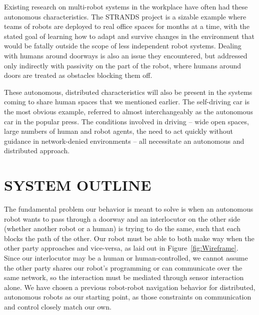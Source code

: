 \documentclass[letterpaper, 10 pt, conference]{ieeeconf}  %
\begin{document}

Existing research on multi-robot systems in the workplace have often had these autonomous characteristics. The STRANDS project\cite{c11} is a sizable example where teams of robots are deployed to real office spaces for months at a time, with the stated goal of learning how to adapt and survive changes in the environment that would be fatally outside the scope of less independent robot systems. Dealing with humans around doorways is also an issue they encountered, but addressed only indirectly with passivity on the part of the robot, where humans around doors are treated as obstacles blocking them off.

These autonomous, distributed characteristics will also be present in the systems coming to share human spaces that we mentioned earlier. The self-driving car is the most obvious example, referred to almost interchangeably as the autonomous car in the popular press\cite{c12}. The conditions involved in driving – wide open spaces, large numbers of human and robot agents, the need to act quickly without guidance in network-denied environments – all necessitate an autonomous and distributed approach.


\section{SYSTEM OUTLINE}

The fundamental problem our behavior is meant to solve is when an autonomous robot wants to pass through a doorway and an interlocutor on the other side (whether another robot or a human) is trying to do the same, such that each blocks the path of the other. Our robot must be able to both make way when the other party approaches and vice-versa, as laid out in Figure~\ref{fig:Wireframe}. Since our interlocutor may be a human or human-controlled, we cannot assume the other party shares our robot’s programming or can communicate over the same network, so the interaction must be mediated through sensor interaction alone. We have chosen a previous robot-robot navigation behavior for distributed, autonomous robots as our starting point, as those constraints on communication and control closely match our own.
\end{document}
